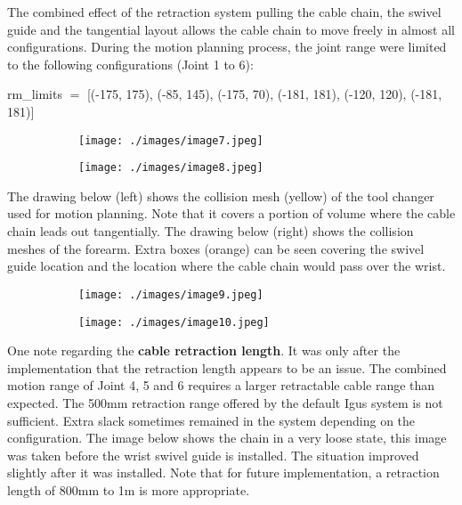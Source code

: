 The combined effect of the retraction system pulling the cable chain, the swivel guide and the tangential layout allows the cable chain to move freely in almost all configurations. During the motion planning process, the joint range were limited to the following configurations (Joint 1 to 6):

{\footnotesize rm\_limits $=$ [(-175, 175), (-85, 145), (-175, 70), (-181, 181), (-120, 120), (-181, 181)]}

\begin{figure}[H]
\centering
\begin{subfigure}[b]{0.45\textwidth}
\centering
\texttt{[image: ./images/image7.jpeg]}
\end{subfigure}
\hfill
\begin{subfigure}[b]{0.45\textwidth}
\centering
\texttt{[image: ./images/image8.jpeg]}
\end{subfigure}
\end{figure}



The drawing below (left) shows the collision mesh (yellow) of the tool changer used for motion planning. Note that it covers a portion of volume where the cable chain leads out tangentially. The drawing below (right) shows the collision meshes of the forearm. Extra boxes (orange) can be seen covering the swivel guide location and the location where the cable chain would pass over the wrist.

\begin{figure}[H]
\centering
\begin{subfigure}[b]{0.45\textwidth}
\centering
\texttt{[image: ./images/image9.jpeg]}
\end{subfigure}
\hfill
\begin{subfigure}[b]{0.45\textwidth}
\centering
\texttt{[image: ./images/image10.jpeg]}
\end{subfigure}
\end{figure}



One note regarding the \textbf{cable retraction length}. It was only after the implementation that the retraction length appears to be an issue. The combined motion range of Joint 4, 5 and 6 requires a larger retractable cable range than expected. The 500mm retraction range offered by the default Igus system is not sufficient. Extra slack sometimes remained in the system depending on the configuration. The image below shows the chain in a very loose state, this image was taken before the wrist swivel guide is installed. The situation improved slightly after it was installed. Note that for future implementation, a retraction length of 800mm to 1m is more appropriate.

